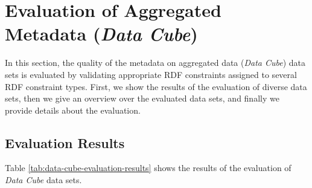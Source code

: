 \documentclass{llncs}
\begin{document}
\section{Evaluation of Aggregated Metadata (\emph{Data Cube})}

In this section, the quality of the metadata on aggregated data (\emph{Data Cube}) data sets is evaluated by validating appropriate RDF constraints assigned to several RDF constraint types.
First, we show the results of the evaluation of diverse data sets, then we give an overview over the evaluated data sets, and finally we provide details about the evaluation.

\subsection{Evaluation Results}

Table \ref{tab:data-cube-evaluation-results} shows the results of the evaluation of \emph{Data Cube} data sets.
\end{document}
